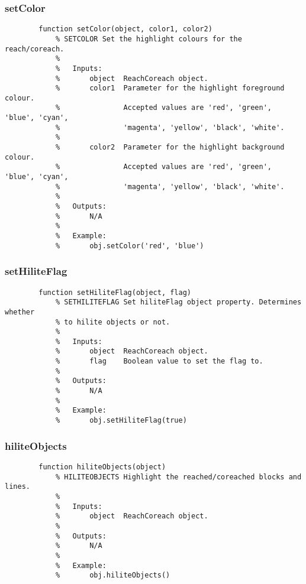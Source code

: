 \documentclass[12pt,letterpaper]{report}
\begin{document}
		\subsubsection{setColor}
\begin{lstlisting}
        function setColor(object, color1, color2)
            % SETCOLOR Set the highlight colours for the reach/coreach.
            %
            %   Inputs:
            %       object  ReachCoreach object.
            %       color1  Parameter for the highlight foreground colour.
            %               Accepted values are 'red', 'green', 'blue', 'cyan',
            %               'magenta', 'yellow', 'black', 'white'.
            %
            %       color2  Parameter for the highlight background colour.
            %               Accepted values are 'red', 'green', 'blue', 'cyan',
            %               'magenta', 'yellow', 'black', 'white'.
            %
            %   Outputs:
            %       N/A
            %
            %   Example:
            %       obj.setColor('red', 'blue')
\end{lstlisting}
		
		\subsubsection{setHiliteFlag}
\begin{lstlisting}
        function setHiliteFlag(object, flag)
            % SETHILITEFLAG Set hiliteFlag object property. Determines whether
            % to hilite objects or not.
            %
            %   Inputs:
            %       object  ReachCoreach object.
            %       flag    Boolean value to set the flag to.
            %
            %   Outputs:
            %       N/A
            %
            %   Example:
            %       obj.setHiliteFlag(true)
\end{lstlisting}
		
		\subsubsection{hiliteObjects}
\begin{lstlisting}
        function hiliteObjects(object)
            % HILITEOBJECTS Highlight the reached/coreached blocks and lines.
            %
            %   Inputs:
            %       object  ReachCoreach object.
            %
            %   Outputs:
            %       N/A
            %
            %   Example:
            %       obj.hiliteObjects()
\end{lstlisting}
		
\end{document}

